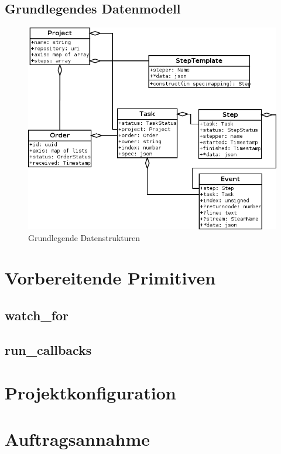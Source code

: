 \subsection{Grundlegendes Datenmodell}


\begin{figure}[ht] 
  \label{fig:datenstrukturen}
  \begin{center}
      \includegraphics[width=\textwidth]{imageinput/datenstrukturen-step-templates.png}
  \end{center}
  \caption{Grundlegende Datenstrukturen}
\end{figure}




\section{Vorbereitende Primitiven}
\subsection{watch\_for}
\subsection{run\_callbacks}

\section{Projektkonfiguration}

\section{Auftragsannahme}

